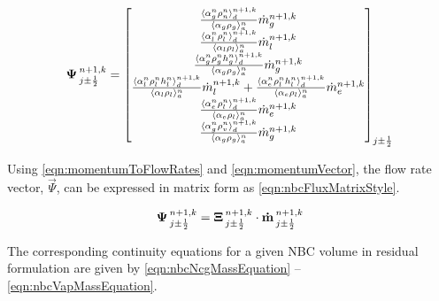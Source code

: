 \begin{equation}
\label{eqn:nbcFluxDefinition}
\vec{\Psi}^{n+1, k}_{j \pm \onehalf} = \begin{bmatrix}
\frac{\don{\alpha^{n}_{g} \rho^{n}_{n}}^{n+1,k}_{d}}{\ave{\alpha_{g} \rho_{g}}^{n}_{a}}\dot{m}^{n+1,k}_{g} \\
%
\frac{\don{\alpha^{n}_{l}\rho^{n}_{l}}^{n+1,k}_{d}}{\ave{\alpha_{l} \rho_{l}}^{n}_{a}}\dot{m}^{n+1,k}_{l}\\
%
\frac{\don{\alpha^{n}_{g} \rho^{n}_{g} h^{n}_{g}}^{n+1,k}_{d}}{\ave{\alpha_{g} \rho_{g}}^{n}_{a}}\dot{m}^{n+1, k}_{g}\\
%
\frac{\don{\alpha^{n}_{l}\rho^{n}_{l} h^{n}_{l}}^{n+1,k}_{d}}{\ave{\alpha_{l} \rho_{l}}^{n}_{a}}\dot{m}^{n+1, k}_{l} +\frac{\don{\alpha^{n}_{e} \rho^{n}_{l} h^{n}_{l}}^{n+1, k}_{d}}{\ave{\alpha_{e} \rho_{l}}^{n}_{a}}\dot{m}^{n+1, k}_{e} \\
%
\frac{ \don{\alpha^{n}_{e} \rho^{n}_{l}}^{n+1, k}_{d}}{ \ave{\alpha_{e} \rho_{l}}^{n}_{a}} \dot{m}^{n+1, k}_{e} \\
%
\frac{ \don{\alpha^{n}_{g} \rho^{n}_{v}}^{n+1, k}_{d}}{ \ave{\alpha_{g} \rho_{g}}^{n}_{a}} \dot{m}^{n+1, k}_{g}
\end{bmatrix}_{j \pm \onehalf}
\end{equation}

Using \eqref{eqn:momentumToFlowRates} and \eqref{eqn:momentumVector}, the flow rate vector, $\vec{\Psi}$, can be expressed in matrix form as \eqref{eqn:nbcFluxMatrixStyle}.

\begin{equation}
\label{eqn:nbcFluxMatrixStyle}
\vec{\Psi}^{n+1, k}_{j \pm \onehalf} = \vec{\Xi}^{n+1, k}_{j \pm \onehalf} \cdot \vec{\dot{m}}^{n+1, k}_{j \pm \onehalf}
\end{equation}

The corresponding continuity equations for a given NBC volume in residual formulation are given by \eqref{eqn:nbcNcgMassEquation} -- \eqref{eqn:nbcVapMassEquation}.

